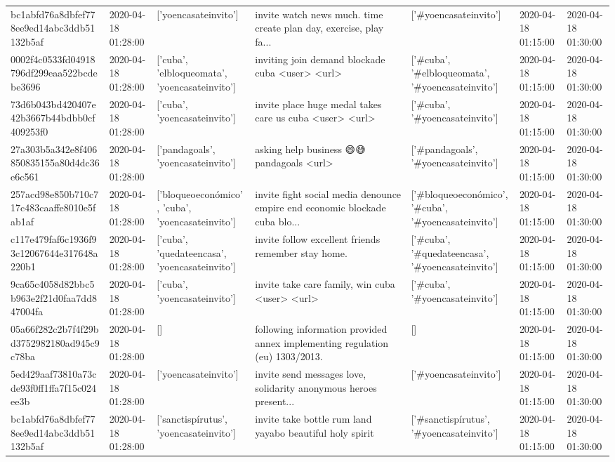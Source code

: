 \begin{tabular}{lllllll}
bc1abfd76a8dbfef778ee9ed14abc3ddb51132b5af & 2020-04-18 01:28:00 & ['yoencasateinvito'] & invite watch news much. time create plan day, exercise, play fa... & ['#yoencasateinvito'] & 2020-04-18 01:15:00 & 2020-04-18 01:30:00 \\
0002f4c0533fd04918796df299eaa522bcdebe3696 & 2020-04-18 01:28:00 & ['cuba', 'elbloqueomata', 'yoencasateinvito'] & inviting join demand blockade cuba <user> <url> & ['#cuba', '#elbloqueomata', '#yoencasateinvito'] & 2020-04-18 01:15:00 & 2020-04-18 01:30:00 \\
73d6b043bd420407e42b3667b44bdbb0cf409253f0 & 2020-04-18 01:28:00 & ['cuba', 'yoencasateinvito'] & invite place huge medal takes care us cuba <user> <url> & ['#cuba', '#yoencasateinvito'] & 2020-04-18 01:15:00 & 2020-04-18 01:30:00 \\
27a303b5a342e8f406850835155a80d4dc36e6c561 & 2020-04-18 01:28:00 & ['pandagoals', 'yoencasateinvito'] & asking help business 😄😅pandagoals <url> & ['#pandagoals', '#yoencasateinvito'] & 2020-04-18 01:15:00 & 2020-04-18 01:30:00 \\
257acd98e850b710c717c483caaffe8010e5fab1af & 2020-04-18 01:28:00 & ['bloqueoeconómico', 'cuba', 'yoencasateinvito'] & invite fight social media denounce empire end economic blockade cuba blo... & ['#bloqueoeconómico', '#cuba', '#yoencasateinvito'] & 2020-04-18 01:15:00 & 2020-04-18 01:30:00 \\
c117e479faf6c1936f93c12067644e317648a220b1 & 2020-04-18 01:28:00 & ['cuba', 'quedateencasa', 'yoencasateinvito'] & invite follow excellent friends remember stay home. & ['#cuba', '#quedateencasa', '#yoencasateinvito'] & 2020-04-18 01:15:00 & 2020-04-18 01:30:00 \\
9ca65c4058d82bbc5b963e2f21d0faa7dd847004fa & 2020-04-18 01:28:00 & ['cuba', 'yoencasateinvito'] & invite take care family, win cuba <user> <url> & ['#cuba', '#yoencasateinvito'] & 2020-04-18 01:15:00 & 2020-04-18 01:30:00 \\
05a66f282c2b7f4f29bd3752982180ad945c9c78ba & 2020-04-18 01:28:00 & [] & following information provided annex implementing regulation (eu) 1303/2013. & [] & 2020-04-18 01:15:00 & 2020-04-18 01:30:00 \\
5ed429aaf73810a73cde93f0ff1ffa7f15c024ee3b & 2020-04-18 01:28:00 & ['yoencasateinvito'] & invite send messages love, solidarity anonymous heroes present... & ['#yoencasateinvito'] & 2020-04-18 01:15:00 & 2020-04-18 01:30:00 \\
bc1abfd76a8dbfef778ee9ed14abc3ddb51132b5af & 2020-04-18 01:28:00 & ['sanctispírutus', 'yoencasateinvito'] & invite take bottle rum land yayabo beautiful holy spirit & ['#sanctispírutus', '#yoencasateinvito'] & 2020-04-18 01:15:00 & 2020-04-18 01:30:00 \\

\end{tabular}
